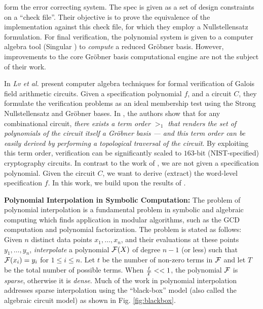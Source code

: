 form the error correcting system. The spec is given as a set of design
constraints on a ``check file''. Their objective is to prove the 
equivalence of the implementation against this check file,
for which they employ a Nullstellensatz formulation.
For final verification, the polynomial system is given
to a computer algebra tool ({\sc Singular} \cite{DGPS}) to {\it
  compute} a reduced Gr\"obner basis. However, improvements to the
core Gr\"obner basis computational engine are not the subject of their
work.   

In %
\cite{lv:date2012} 
{\it Lv et al.} present computer algebra
techniques for formal verification of Galois field arithmetic
circuits. Given a specification polynomial $f$, and a circuit $C$,
they formulate the verification problems as an ideal membership test
using the Strong Nullstellensatz and Gr\"obner bases. In \cite{lv:date2012}, the
authors show that for any combinational circuit, {\it there exists
a term order $>_1$ that renders the set of polynomials of the circuit
itself a Gr\"obner basis --- and this term order can be easily derived
by performing a topological traversal of the circuit}. By exploiting
this term order, verification can be significantly scaled
to $163$-bit (NIST-specified) cryptography circuits. 
In contrast to the work of \cite{lv:date2012}, we are not given a
specification polynomial. Given the circuit $C$, we want
to derive (extract) the word-level specification $f$. 
In this work, we build upon the results of
\cite{lv:date2012}. 

{\bf Polynomial Interpolation in Symbolic Computation:}
The problem of polynomial interpolation is a fundamental problem in
symbolic and algebraic computing which finds application in modular
algorithms, such as the GCD computation and polynomial
factorization. The problem is stated as follows: Given $n$ distinct
data points $x_1, \dots, x_n$, and their evaluations at these points
$y_1, \dots, y_n$,  {\it interpolate} a polynomial ${\mathcal{F}}(X)$ of degree
$n-1$ (or less) such that ${\mathcal{F}}(x_i) = y_i$ for $1 \leq i \leq n$. 
Let $t$ be the number of non-zero terms in ${\mathcal{F}}$ and let $T$ be the
total number of possible terms. When ${{t} \over {T}} << 1$, the
polynomial ${\mathcal{F}}$ is {\it sparse}, otherwise it is {\it dense}. Much of
the work in polynomial interpolation addresses sparse 
interpolation using the ``black-box'' model (also called the
algebraic circuit model) as shown in Fig. \ref{fig:blackbox}. 


